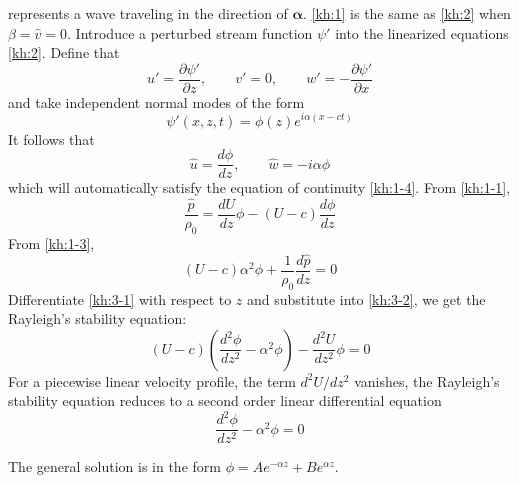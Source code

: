represents a wave traveling in the direction of
$\boldsymbol{\alpha}$. \eqref{kh:1} is the same as \eqref{kh:2} when
$\beta=\hat{v}=0$.
\newslide
Introduce a perturbed stream function $\psi'$ into the linearized
equations \eqref{kh:2}. Define that
\begin{equation}\label{kh:str1}
    u'=\frac{\partial\psi'}{\partial z},\qquad v'=0,\qquad w'=-\frac{\partial\psi'}{\partial x}
\end{equation}
and take independent normal modes of the form
\begin{equation}\label{kh:modes2}
    \psi'(x,z,t)=\phi(z)e^{i\alpha(x-ct)}
\end{equation}
\newslide
It follows that
\begin{equation}\label{kh:str2}
    \hat{u}=\frac{d\phi}{dz},\qquad \hat{w}=-i\alpha\phi
\end{equation}
which will automatically satisfy the equation of continuity
\eqref{kh:1-4}.
\newslide
From \eqref{kh:1-1},
\begin{equation}\label{kh:3-1}
    \frac{\hat{p}}{\rho_0}=\frac{dU}{dz}\phi-(U-c)\frac{d\phi}{dz}
\end{equation}
From \eqref{kh:1-3},
\begin{equation}\label{kh:3-2}
    (U-c)\alpha^2\phi+\frac{1}{\rho_0}\frac{d\hat{p}}{dz}=0
\end{equation}
Differentiate \eqref{kh:3-1} with respect to $z$ and substitute into
\eqref{kh:3-2}, we get the Rayleigh's stability equation:
\begin{equation}\label{kh:ray}
    \boxed{(U-c)(\frac{d^2\phi}{dz^2}-\alpha^2\phi)-\frac{d^2U}{dz^2}\phi=0}
\end{equation}
\newslide
For a piecewise linear velocity profile, the term $d^2U/dz^2$
vanishes, the Rayleigh's stability equation reduces to a second
order linear differential equation
\begin{equation}\label{kh:ray2}
    \frac{d^2\phi}{dz^2}-\alpha^2\phi=0
\end{equation}

The general solution is in the form $\phi = Ae^{-\alpha
z}+Be^{\alpha z}$.
